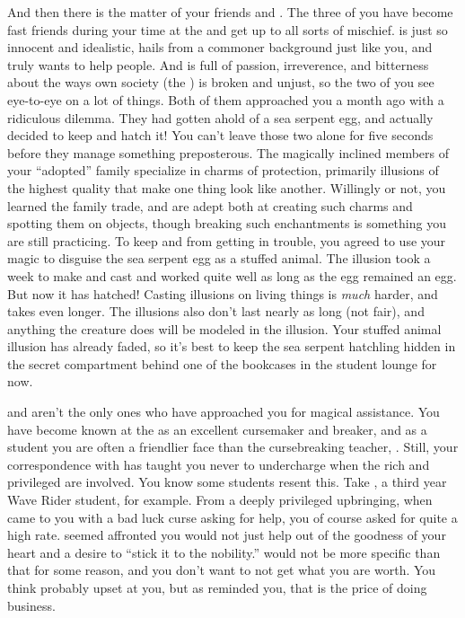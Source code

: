 \documentclass[char]{GL2020}
\begin{document}
And then there is the matter of your friends \cDisney{\full} and \cPirateChild{\full}. The three of you have become fast friends during your time at the \pSchool{} and get up to all sorts of mischief. \cDisney{} is just so innocent and idealistic, hails from a commoner background just like you, and truly wants to help people. And \cPirateChild{} is full of passion, irreverence, and bitterness about the ways \cPirateChild{\their} own society (the \pShip{}) is broken and unjust, so the two of you see eye-to-eye on a lot of things. Both of them approached you a month ago with a ridiculous dilemma. They had gotten ahold of a sea serpent egg, and actually decided to keep and hatch it! You can't leave those two alone for five seconds before they manage something preposterous. The magically inclined members of your ``adopted'' family specialize in charms of protection, primarily illusions of the highest quality that make one thing look like another. Willingly or not, you learned the family trade, and are adept both at creating such charms and spotting them on objects, though breaking such enchantments is something you are still practicing. To keep \cDisney{} and \cPirateChild{} from getting in trouble, you agreed to use your magic to disguise the sea serpent egg as a stuffed animal. The illusion took a week to make and cast and worked quite well as long as the egg remained an egg. But now it has hatched! Casting illusions on living things is \emph{much} harder, and takes even longer. The illusions also don't last nearly as long (not fair), and anything the creature does will be modeled in the illusion. Your stuffed animal illusion has already faded, so it's best to keep the sea serpent hatchling hidden in the secret compartment behind one of the bookcases in the student lounge for now.

\cDisney{} and \cPirateChild{} aren’t the only ones who have approached you for magical assistance. You have become known at the \pSchool{} as an excellent cursemaker and breaker, and as a student you are often a friendlier face than the cursebreaking teacher, \cPrince{}. Still, your correspondence with \cCurse{} has taught you never to undercharge when the rich and privileged are involved. You know some students resent this. Take \cInitiate{\full}, a third year Wave Rider student, for example. From a deeply privileged upbringing, when \cInitiate{\they} came to you with a bad luck curse asking for help, you of course asked for quite a high rate. \cInitiate{} seemed affronted you would not just help \cInitiate{\them} out of the goodness of your heart and a desire to “stick it to the \pFarm{} nobility.” \cInitiate{\They} would not be more specific than that for some reason, and you don’t want to not get what you are worth. You think \cInitiate{\theyare} probably upset at you, but as \cLibAssist{} reminded you, that is the price of doing business.   
\end{document}
